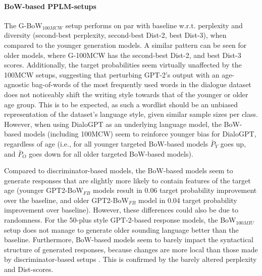\paragraph{BoW-based PPLM-setups} The G-BoW$_{100MCW}$ setup performs on par with baseline w.r.t. perplexity and diversity (second-best perplexity, second-best Dist-2, best Dist-3), when compared to the younger generation models. A similar pattern can be seen for older models, where G-100MCW has the second-best Dist-2, and best Dist-3 scores. Additionally, the target probabilities seem virtually unaffected by the 100MCW setups, suggesting that perturbing GPT-2's output with an age-agnostic bag-of-words of the most frequently used words in the dialogue dataset does not noticeably shift the writing style towards that of the younger or older age group. This is to be expected, as such a wordlist should be an unbiased representation of the dataset's language style, given similar sample sizes per class.
However, when using DialoGPT as an underlying language model, the BoW-based models (including 100MCW) seem to reinforce younger bias for DialoGPT, regardless of age (i.e., for all younger targeted BoW-based models $\bar{P}_Y$ goes up, and $\bar{P}_O$ goes down for all older targeted BoW-based models).

Compared to discriminator-based models, the BoW-based models seem to generate responses that are slightly more likely to contain features of the target age (younger GPT2-BoW$_{FB}$ models result in 0.06 target probability improvement over the baseline, and older GPT2-BoW$_{FB}$ model in 0.04 target probability improvement over baseline). However, these differences could also be due to randomness. For the 50-plus style GPT-2-based response models, the BoW$_{100MIU}$ setup does not manage to generate older sounding language better than the baseline. Furthermore, BoW-based models seem to barely impact the syntactical structure of generated responses, because changes are more local than those made by discriminator-based setups \cite{dathathri2019plug}. This is confirmed by the barely altered perplexity and Dist-scores. 

